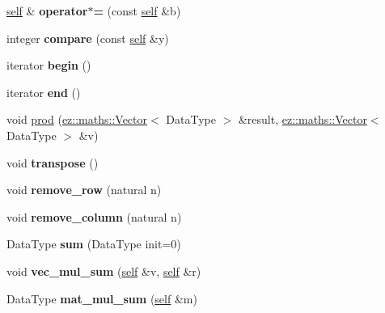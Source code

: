 \begin{DoxyCompactItemize}
\item 
\mbox{\label{classez_1_1maths_1_1Matrix_ac17580a4d464b3c849cf52b74cd6607d}} 
\hyperlink{classez_1_1maths_1_1Matrix}{self} \& {\bfseries operator$\ast$=} (const \hyperlink{classez_1_1maths_1_1Matrix}{self} \&b)
\item 
\mbox{\label{classez_1_1maths_1_1Matrix_add06a09122f9d982655fa0b6a2c723fc}} 
integer {\bfseries compare} (const \hyperlink{classez_1_1maths_1_1Matrix}{self} \&y)
\item 
\mbox{\label{classez_1_1maths_1_1Matrix_a3b7e8b5d99b96d5bbea681ea2e806cd9}} 
iterator {\bfseries begin} ()
\item 
\mbox{\label{classez_1_1maths_1_1Matrix_aa9935d5a54edca1edaa39c8267cb9d78}} 
iterator {\bfseries end} ()
\item 
void \hyperlink{classez_1_1maths_1_1Matrix_a28472a82209513ed5934209c0e8b5a7a}{prod} (\hyperlink{classez_1_1maths_1_1Vector}{ez\+::maths\+::\+Vector}$<$ Data\+Type $>$ \&result, \hyperlink{classez_1_1maths_1_1Vector}{ez\+::maths\+::\+Vector}$<$ Data\+Type $>$ \&v)
\item 
\mbox{\label{classez_1_1maths_1_1Matrix_a7a0682d82824b3d994786cbccbec2a03}} 
void {\bfseries transpose} ()
\item 
\mbox{\label{classez_1_1maths_1_1Matrix_a5f08d49f2e49d4bc32dc2452933f1093}} 
void {\bfseries remove\+\_\+row} (natural n)
\item 
\mbox{\label{classez_1_1maths_1_1Matrix_a1007c648a87f5e9dab3d9225be604e45}} 
void {\bfseries remove\+\_\+column} (natural n)
\item 
\mbox{\label{classez_1_1maths_1_1Matrix_aed27f1b29878684ee27af417122a0084}} 
Data\+Type {\bfseries sum} (Data\+Type init=0)
\item 
\mbox{\label{classez_1_1maths_1_1Matrix_aa5ef70156e11adf93b188af921366332}} 
void {\bfseries vec\+\_\+mul\+\_\+sum} (\hyperlink{classez_1_1maths_1_1Matrix}{self} \&v, \hyperlink{classez_1_1maths_1_1Matrix}{self} \&r)
\item 
\mbox{\label{classez_1_1maths_1_1Matrix_a3ebde4c806e787916b78fee9b73d89ed}} 
Data\+Type {\bfseries mat\+\_\+mul\+\_\+sum} (\hyperlink{classez_1_1maths_1_1Matrix}{self} \&m)
\end{DoxyCompactItemize}
